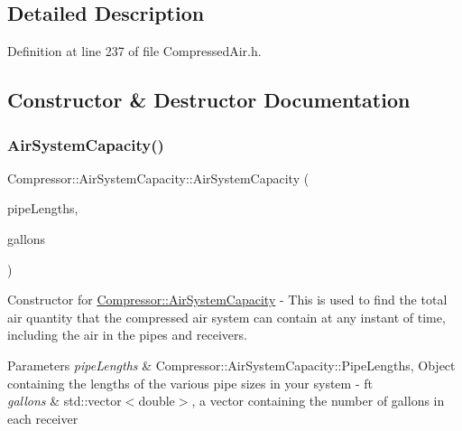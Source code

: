 \subsection{Detailed Description}


Definition at line 237 of file Compressed\+Air.\+h.



\subsection{Constructor \& Destructor Documentation}
\mbox{\label{class_compressor_1_1_air_system_capacity_a270fa85146172b46703970a1bc8fe724}} 
\subsubsection{\texorpdfstring{Air\+System\+Capacity()}{AirSystemCapacity()}\hspace{0.1cm}{\footnotesize\ttfamily [1/3]}}
{\footnotesize\ttfamily Compressor\+::\+Air\+System\+Capacity\+::\+Air\+System\+Capacity (\begin{DoxyParamCaption}\item[{\hyperlink{struct_compressor_1_1_pipe_data}{Compressor\+::\+Pipe\+Data}}]{pipe\+Lengths,  }\item[{std\+::vector$<$ double $>$}]{gallons }\end{DoxyParamCaption})}

Constructor for \hyperlink{class_compressor_1_1_air_system_capacity}{Compressor\+::\+Air\+System\+Capacity} -\/ This is used to find the total air quantity that the compressed air system can contain at any instant of time, including the air in the pipes and receivers. 
\begin{DoxyParams}{Parameters}
{\em pipe\+Lengths} & Compressor\+::\+Air\+System\+Capacity\+::\+Pipe\+Lengths, Object containing the lengths of the various pipe sizes in your system -\/ ft \\
\hline
{\em gallons} & std\+::vector$<$double$>$, a vector containing the number of gallons in each receiver \\
\hline
\end{DoxyParams}


